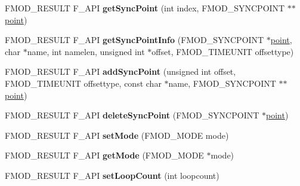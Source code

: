 \begin{DoxyCompactItemize}
\item 
\hypertarget{class_f_m_o_d_1_1_sound_ab091d9a05e5f30f7a3ffbe1503335d32}{F\+M\+O\+D\+\_\+\+R\+E\+S\+U\+L\+T F\+\_\+\+A\+P\+I {\bfseries get\+Sync\+Point} (int index, F\+M\+O\+D\+\_\+\+S\+Y\+N\+C\+P\+O\+I\+N\+T $\ast$$\ast$\hyperlink{structpoint}{point})}\label{class_f_m_o_d_1_1_sound_ab091d9a05e5f30f7a3ffbe1503335d32}

\item 
\hypertarget{class_f_m_o_d_1_1_sound_a99aa787828a6fa111ba2663a3c35b6e0}{F\+M\+O\+D\+\_\+\+R\+E\+S\+U\+L\+T F\+\_\+\+A\+P\+I {\bfseries get\+Sync\+Point\+Info} (F\+M\+O\+D\+\_\+\+S\+Y\+N\+C\+P\+O\+I\+N\+T $\ast$\hyperlink{structpoint}{point}, char $\ast$name, int namelen, unsigned int $\ast$offset, F\+M\+O\+D\+\_\+\+T\+I\+M\+E\+U\+N\+I\+T offsettype)}\label{class_f_m_o_d_1_1_sound_a99aa787828a6fa111ba2663a3c35b6e0}

\item 
\hypertarget{class_f_m_o_d_1_1_sound_abb46f258c1ac4563f20b17a4647b0dc0}{F\+M\+O\+D\+\_\+\+R\+E\+S\+U\+L\+T F\+\_\+\+A\+P\+I {\bfseries add\+Sync\+Point} (unsigned int offset, F\+M\+O\+D\+\_\+\+T\+I\+M\+E\+U\+N\+I\+T offsettype, const char $\ast$name, F\+M\+O\+D\+\_\+\+S\+Y\+N\+C\+P\+O\+I\+N\+T $\ast$$\ast$\hyperlink{structpoint}{point})}\label{class_f_m_o_d_1_1_sound_abb46f258c1ac4563f20b17a4647b0dc0}

\item 
\hypertarget{class_f_m_o_d_1_1_sound_a21e86318ac39e576111e642b57db4187}{F\+M\+O\+D\+\_\+\+R\+E\+S\+U\+L\+T F\+\_\+\+A\+P\+I {\bfseries delete\+Sync\+Point} (F\+M\+O\+D\+\_\+\+S\+Y\+N\+C\+P\+O\+I\+N\+T $\ast$\hyperlink{structpoint}{point})}\label{class_f_m_o_d_1_1_sound_a21e86318ac39e576111e642b57db4187}

\item 
\hypertarget{class_f_m_o_d_1_1_sound_a8410551349a26de45abe6a931ea6965a}{F\+M\+O\+D\+\_\+\+R\+E\+S\+U\+L\+T F\+\_\+\+A\+P\+I {\bfseries set\+Mode} (F\+M\+O\+D\+\_\+\+M\+O\+D\+E mode)}\label{class_f_m_o_d_1_1_sound_a8410551349a26de45abe6a931ea6965a}

\item 
\hypertarget{class_f_m_o_d_1_1_sound_ae8bfe6364a2283c43c21f03d43daafe5}{F\+M\+O\+D\+\_\+\+R\+E\+S\+U\+L\+T F\+\_\+\+A\+P\+I {\bfseries get\+Mode} (F\+M\+O\+D\+\_\+\+M\+O\+D\+E $\ast$mode)}\label{class_f_m_o_d_1_1_sound_ae8bfe6364a2283c43c21f03d43daafe5}

\item 
\hypertarget{class_f_m_o_d_1_1_sound_af5da99ae0aff53b50910a36e3510d7ba}{F\+M\+O\+D\+\_\+\+R\+E\+S\+U\+L\+T F\+\_\+\+A\+P\+I {\bfseries set\+Loop\+Count} (int loopcount)}\label{class_f_m_o_d_1_1_sound_af5da99ae0aff53b50910a36e3510d7ba}


\end{DoxyCompactItemize}
